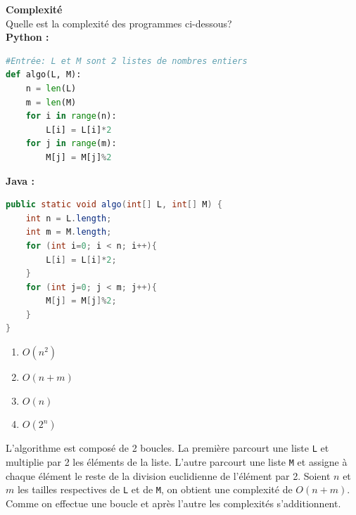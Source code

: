\begin{Exercice}[10 minutes] \textbf{Complexité} \\
    Quelle est la complexité des programmes ci-dessous?\\
        \textbf{Python :}
        \begin{lstlisting}[language=Python]
#Entrée: L et M sont 2 listes de nombres entiers
def algo(L, M):
    n = len(L)
    m = len(M)
    for i in range(n):
        L[i] = L[i]*2
    for j in range(m):
        M[j] = M[j]%2
        \end{lstlisting}
        
        \textbf{Java :}
        \begin{lstlisting}[language=Java]
public static void algo(int[] L, int[] M) {
    int n = L.length;
    int m = M.length;
    for (int i=0; i < n; i++){
        L[i] = L[i]*2;
    }
    for (int j=0; j < m; j++){
        M[j] = M[j]%2;
    }
}
        \end{lstlisting}

        \begin{enumerate}
            \item $O(n^2)$
            \item $O(n + m)$
            \item $O(n)$
            \item $O(2^n)$
        \end{enumerate}

        \begin{solution}
        L'algorithme est composé de 2 boucles. La première parcourt une liste \lstinline{L} et multiplie par 2 les éléments de la liste. 
        L'autre parcourt une liste \lstinline{M} et assigne à chaque élément le reste de la division euclidienne de l'élément par 2. 
        Soient $n$ et $m$ les tailles respectives de \lstinline{L} et de \lstinline{M}, on obtient une complexité de $O(n + m)$. 
        Comme on effectue une boucle et après l'autre les complexités s'additionnent.
        \end{solution}
\end{Exercice}

